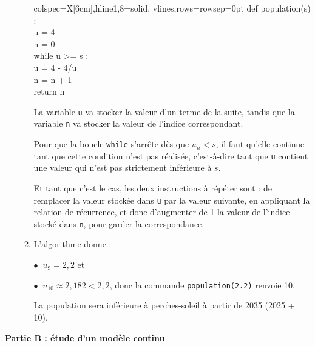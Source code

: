 \begin{enumerate}
\begin{enumerate}
		\begin{center}
			\begin{ttfamily}
			\begin{tblr}{colspec={X[6cm]},hline{1,8}={solid},
			vlines,rows={rowsep=0pt}}
			def population(s) :\\
			\quad u = 4\\
			\quad n = 0\\
			\quad while u >= s :\\
			\quad \quad u = 4 - 4/u\\
			\quad \quad n = n + 1\\
			\quad return n
			\end{tblr}
		\end{ttfamily}
		\end{center}

La variable \texttt{u} va stocker la valeur d'un terme de la suite, tandis que la variable \texttt{n} va stocker la valeur de l'indice correspondant.

Pour que la boucle \texttt{while} s'arrête dès que $u_n < s$, il faut qu'elle continue tant que cette condition n'est pas réalisée, c'est-à-dire tant que \texttt{u} contient une valeur qui n'est pas strictement inférieure à $s$.

Et tant que c'est le cas, les deux instructions à répéter sont : de remplacer la valeur stockée dans \texttt{u} par la valeur suivante, en appliquant la relation de récurrence, et donc d'augmenter de 1 la valeur de l'indice stocké dans \texttt{n}, pour garder la correspondance.
		\item L'algorithme donne :

$\bullet~$ $u_9 = 2,2$ et 

$\bullet~$ $u_{10} \approx 2,182 <  2,2$, donc la commande \texttt{population(2.2)} renvoie 10.

La population sera inférieure à  perches-soleil à partir de 2035 (2025 + 10).
	\end{enumerate}
	\end{enumerate}

	\textbf{Partie B : étude d'un modèle continu}
	
